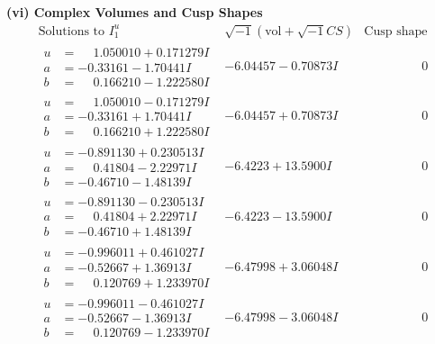 \documentclass[1p]{elsarticle_modified}
\theoremstyle{definition}
\newcommand{\I}{\sqrt{-1}}
\begin{document}
\newpage\flushleft \textbf{(vi) Complex Volumes and Cusp Shapes}
$$\begin{array}{c|c|c}  
\text{Solutions to }I^u_{1}& \I (\text{vol} + \sqrt{-1}CS) & \text{Cusp shape}\\
 \hline 
\begin{aligned}
u &= \phantom{-}1.050010 + 0.171279 I \\
a &= -0.33161 - 1.70441 I \\
b &= \phantom{-}0.166210 - 1.222580 I\end{aligned}
 & -6.04457 - 0.70873 I & \phantom{-0.000000 } 0 \\ \hline\begin{aligned}
u &= \phantom{-}1.050010 - 0.171279 I \\
a &= -0.33161 + 1.70441 I \\
b &= \phantom{-}0.166210 + 1.222580 I\end{aligned}
 & -6.04457 + 0.70873 I & \phantom{-0.000000 } 0 \\ \hline\begin{aligned}
u &= -0.891130 + 0.230513 I \\
a &= \phantom{-}0.41804 - 2.22971 I \\
b &= -0.46710 - 1.48139 I\end{aligned}
 & -6.4223 + 13.5900 I & \phantom{-0.000000 } 0 \\ \hline\begin{aligned}
u &= -0.891130 - 0.230513 I \\
a &= \phantom{-}0.41804 + 2.22971 I \\
b &= -0.46710 + 1.48139 I\end{aligned}
 & -6.4223 - 13.5900 I & \phantom{-0.000000 } 0 \\ \hline\begin{aligned}
u &= -0.996011 + 0.461027 I \\
a &= -0.52667 + 1.36913 I \\
b &= \phantom{-}0.120769 + 1.233970 I\end{aligned}
 & -6.47998 + 3.06048 I & \phantom{-0.000000 } 0 \\ \hline\begin{aligned}
u &= -0.996011 - 0.461027 I \\
a &= -0.52667 - 1.36913 I \\
b &= \phantom{-}0.120769 - 1.233970 I\end{aligned}
 & -6.47998 - 3.06048 I & \phantom{-0.000000 } 0 \\ \hline\begin{aligned}

\end{aligned}
\end{array}$$
\end{document}
